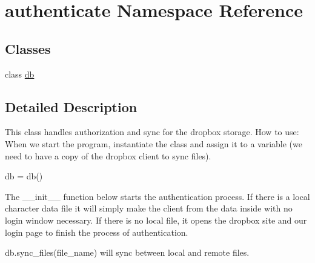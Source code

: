 \hypertarget{namespaceauthenticate}{\section{authenticate Namespace Reference}
\label{namespaceauthenticate}
}
\subsection*{Classes}
\begin{DoxyCompactItemize}
\item 
class \hyperlink{classauthenticate_1_1db}{db}
\end{DoxyCompactItemize}


\subsection{Detailed Description}
\begin{DoxyVerb}This class handles authorization and sync for the dropbox storage. How to use:
When we start the program, instantiate the class and assign it to a variable (we
need to have a copy of the dropbox client to sync files).
  
db = db()
  
The __init__ function below starts the authentication process. If there is a local
character data file it will simply make the client from the data inside with no
login window necessary. If there is no local file, it opens the dropbox site and
our login page to finish the process of authentication.
  
db.sync_files(file_name) will sync between local and remote files.\end{DoxyVerb}
 